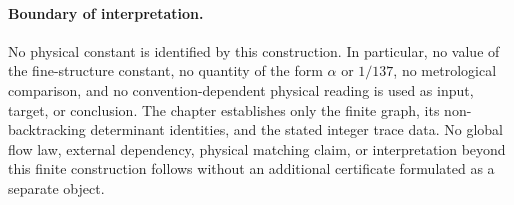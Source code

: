 \paragraph{Boundary of interpretation.}
No physical constant is identified by this construction. In particular, no value of the fine-structure constant, no quantity of the form $\alpha$ or $1/137$, no metrological comparison, and no convention-dependent physical reading is used as input, target, or conclusion. The chapter establishes only the finite graph, its non-backtracking determinant identities, and the stated integer trace data. No global flow law, external dependency, physical matching claim, or interpretation beyond this finite construction follows without an additional certificate formulated as a separate object.
